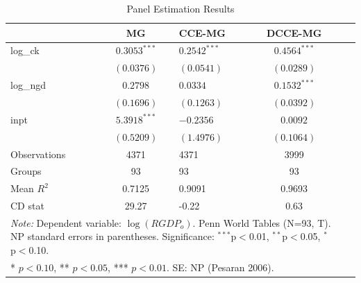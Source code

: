
\begin{table}[htbp]
  \centering
  \caption{Panel Estimation Results}
  \label{tab:results_multi}
  \begin{tabular}{lclclc}
  \hline\hline
  & MG & CCE-MG & DCCE-MG \\
  \hline
  log\_ck & $0.3053^{***}$ & $0.2542^{***}$ & $0.4564^{***}$ \\ 
   & $(0.0376)$ & $(0.0541)$ & $(0.0289)$ \\[4pt]
  log\_ngd & $0.2798$ & $0.0334$ & $0.1532^{***}$ \\ 
   & $(0.1696)$ & $(0.1263)$ & $(0.0392)$ \\[4pt]
  inpt & $5.3918^{***}$ & $-0.2356$ & $0.0092$ \\ 
   & $(0.5209)$ & $(1.4976)$ & $(0.1064)$ \\[4pt]
  \hline
  Observations & 4371 & 4371 & 3999 \\
  Groups & 93 & 93 & 93 \\
  Mean $R^2$ & 0.7125 & 0.9091 & 0.9693 \\
  CD stat & 29.27 & -0.22 & 0.63 \\
  \hline\hline
  \multicolumn{4}{l}{\textit{Note:} Dependent variable: $\log(RGDP_o)$. Penn World Tables (N=93, T\approx 50). NP standard errors in parentheses. Significance: $^{***}$p$<$0.01, $^{**}$p$<$0.05, $^{*}$p$<$0.10.} \\
  \multicolumn{4}{l}{* $p<0.10$, ** $p<0.05$, *** $p<0.01$. SE: NP (Pesaran 2006).} \\
  \end{tabular}
\end{table}
